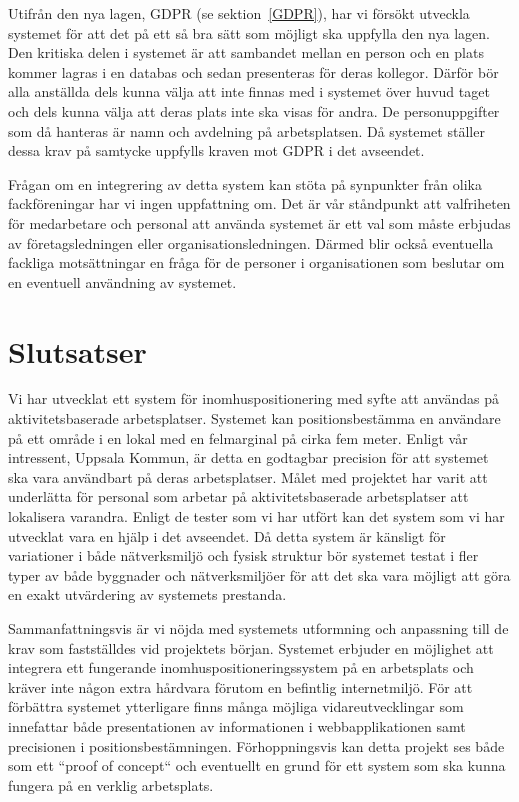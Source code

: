 \documentclass[a4paper,12pt]{article}
\begin{document}
Utifrån den nya lagen, GDPR (se sektion~\ref{GDPR}), har vi försökt utveckla systemet för att det på ett så bra sätt som möjligt ska uppfylla den nya lagen.  Den kritiska delen i systemet är att sambandet mellan en person och en plats kommer lagras i en databas och sedan presenteras för deras kollegor. Därför bör alla anställda dels kunna välja att inte finnas med i systemet över huvud taget och dels kunna välja att deras plats inte ska visas för andra. De personuppgifter som då hanteras är namn och avdelning på arbetsplatsen. Då systemet ställer dessa krav på samtycke uppfylls kraven mot GDPR i det avseendet.

Frågan om en integrering av detta system kan stöta på synpunkter från olika \\fackföreningar har vi ingen uppfattning om. Det är vår ståndpunkt att valfriheten för medarbetare och personal att använda systemet är ett val som måste erbjudas av företagsledningen eller organisationsledningen. Därmed blir också eventuella fackliga motsättningar en fråga för de personer i organisationen som beslutar om en eventuell användning av systemet.



\section{Slutsatser}

Vi har utvecklat ett system för inomhuspositionering med syfte att användas på aktivitetsbaserade arbetsplatser. Systemet kan positionsbestämma en användare på ett område i en lokal med en felmarginal på cirka fem meter. Enligt vår intressent, Uppsala Kommun, är detta en godtagbar precision för att systemet ska vara användbart på deras arbetsplatser. Målet med projektet har varit att underlätta för personal som arbetar på aktivitetsbaserade arbetsplatser att lokalisera varandra. Enligt de tester som vi har utfört kan det system som vi har utvecklat vara en hjälp i det avseendet.
Då detta system är känsligt för variationer i både nätverksmiljö och fysisk struktur bör systemet testat i fler typer av både byggnader och nätverksmiljöer för att det ska vara möjligt att göra en exakt utvärdering av systemets prestanda.

Sammanfattningsvis är vi nöjda med systemets utformning och anpassning till de krav som fastställdes vid projektets början. Systemet erbjuder en möjlighet att integrera ett fungerande inomhuspositioneringssystem på en arbetsplats och kräver inte någon extra hårdvara förutom en befintlig internetmiljö. För att förbättra systemet ytterligare finns många möjliga vidareutvecklingar som innefattar både presentationen av informationen i webbapplikationen samt precisionen i positionsbestämningen. Förhoppningsvis kan detta projekt ses både som ett ``proof of concept`` och eventuellt en grund för ett system som ska kunna fungera på en verklig arbetsplats.
\end{document}
